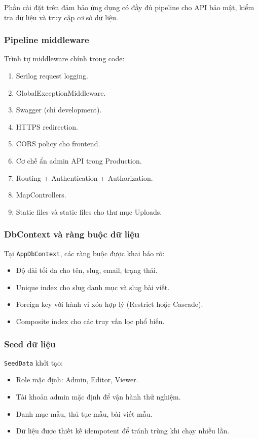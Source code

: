 \documentclass[12pt,a4paper]{article}
\begin{document}
Phần cài đặt trên đảm bảo ứng dụng có đầy đủ pipeline cho API bảo mật, kiểm tra dữ liệu và truy cập cơ sở dữ liệu.

\subsubsection{Pipeline middleware}
Trình tự middleware chính trong code:
\begin{enumerate}[leftmargin=1.1cm]
  \item Serilog request logging.
  \item GlobalExceptionMiddleware.
  \item Swagger (chỉ development).
  \item HTTPS redirection.
  \item CORS policy cho frontend.
  \item Cơ chế ẩn admin API trong Production.
  \item Routing + Authentication + Authorization.
  \item MapControllers.
  \item Static files và static files cho thư mục Uploads.
\end{enumerate}

\subsubsection{DbContext và ràng buộc dữ liệu}
Tại \texttt{AppDbContext}, các ràng buộc được khai báo rõ:
\begin{itemize}[leftmargin=1.1cm]
  \item Độ dài tối đa cho tên, slug, email, trạng thái.
  \item Unique index cho slug danh mục và slug bài viết.
  \item Foreign key với hành vi xóa hợp lý (Restrict hoặc Cascade).
  \item Composite index cho các truy vấn lọc phổ biến.
\end{itemize}

\subsubsection{Seed dữ liệu}
\texttt{SeedData} khởi tạo:
\begin{itemize}[leftmargin=1.1cm]
  \item Role mặc định: Admin, Editor, Viewer.
  \item Tài khoản admin mặc định để vận hành thử nghiệm.
  \item Danh mục mẫu, thủ tục mẫu, bài viết mẫu.
  \item Dữ liệu được thiết kế idempotent để tránh trùng khi chạy nhiều lần.
\end{itemize}
\end{document}

